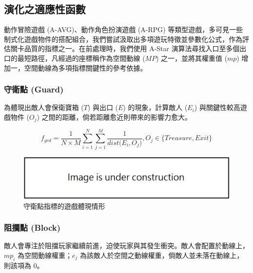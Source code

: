 \subsection{演化之適應性函數}
\label{ssec:method-segments-fitnesses}

動作冒險遊戲 (A-AVG)、動作角色扮演遊戲 (A-RPG) 等類型遊戲，多可見一些制式化遊戲物件的搭配組合，我們嘗試汲取出多項遊玩特徵並參數化公式，作為評估關卡品質的指標之一。在前處理時，我們使用 A-Star 演算法尋找入口至多個出口的最短路徑，凡經過的座標稱作為空間動線 ($MP$) 之一，並將其權重值 ($mp$) 增加一，空間動線為多項指標關鍵性的參考依據。

\subsubsection{守衛點 (Guard)}
\label{sssec:method-segments-fitnesses-guard}

為體現出敵人會保衛寶箱 ($T$) 與出口 ($E$) 的現象，計算敵人 ($E_{i}$) 與關鍵性較高遊戲物件 ($O_{j}$) 之間的距離，倘若距離愈近則帶來的影響力愈大。

\begin{equation}
    f_{grd}=\frac{1}{N \times M} \sum_{i=1}^{N} \sum_{j=1}^{M} \frac{1}{dist\big(E_{i}, O_{j}\big)}, O_{j} \in \{ Treasure, Exit \}
\end{equation}

\begin{figure}[ht]
  \begin{center}
    \includegraphics[width=1.0\textwidth]{figures/under_construction.png}
    \caption{守衛點指標的遊戲體現情形}
    \label{fig:fitnesses-guard-gameplay}
  \end{center}
\end{figure}

\subsubsection{阻攔點 (Block)}
\label{sssec:method-segments-fitnesses-block}

敵人會專注於阻擋玩家繼續前進，迫使玩家與其發生衝突。敵人會配置於動線上，$mp_{i}$ 為空間動線權重；$e_j$ 為該敵人於空間之動線權重，倘敵人並未落在動線上，則該項為 0。

